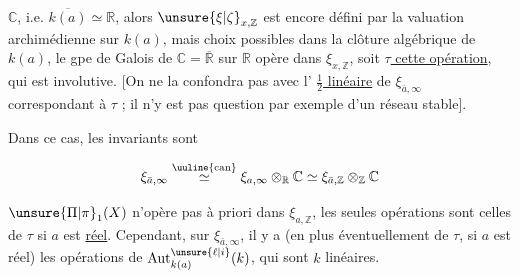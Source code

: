 $\mathbb{C}$, i.e. $\overline{k(a)}\simeq\mathbb{R}$, alors $\unsure{\xi|\zeta}_{x,\mathbb{Z}}$ est encore défini par la valuation archimédienne sur $k(a)$, mais   choix possibles dans la clôture algébrique de $k(a)$, le gpe de Galois de $\mathbb{C}=\overline{\mathbb{R}}$ sur $\mathbb{R}$ opère dans $\xi_{x,\mathbb{Z}}$, soit \uline{$\tau$ cette opération}, qui est involutive. [On ne la confondra pas avec l’ \uline{$\tfrac12$ linéaire} de $\xi_{\bar{a},\infty}$ correspondant à $\tau$ ; il n’y est pas question par exemple d’un réseau stable].



Dans ce cas, les invariants sont


\[
\xi_{\bar{a},\infty}\overset{\text{\uuline{can}}}{\simeq}\xi_{a,\infty}\otimes_{\mathbb{R}}\mathbb{C}\simeq\xi_{\bar{a},\mathbb{Z}}\otimes_{\mathbb{Z}}\mathbb{C}
\]

$\unsure{\Pi|\pi}_1(X)$ n’opère pas à priori dans $\xi_{a,\mathbb{Z}}$, les seules opérations sont celles de $\tau$ si $a$ est \uline{réel}. Cependant, sur $\xi_{\bar{a},\infty}$, il y a (en plus éventuellement de $\tau$, si $a$ est réel) les opérations de $\operatorname{Aut}_{k(a)}^{\unsure{\ell|i}}(k)$, qui sont $k$ linéaires.

